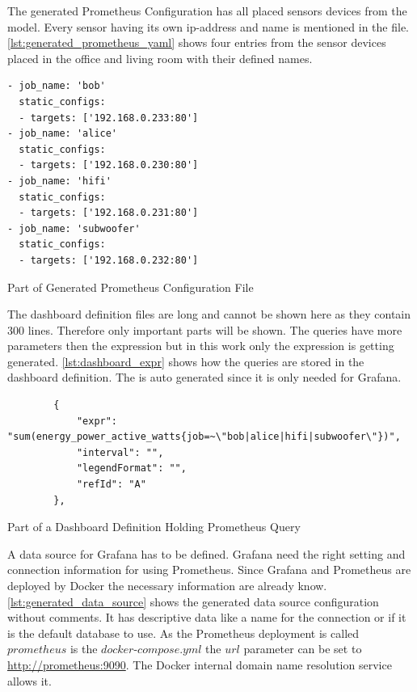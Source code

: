 The generated Prometheus Configuration has all placed sensors devices from the model. Every sensor having its own \gls{ip-address} and name is mentioned in the file. \cref{lst:generated_prometheus_yaml} shows four entries from the sensor devices placed in the office and living room with their defined names.

\begin{listing}[!ht]
	\begin{verbatim}
- job_name: 'bob'
  static_configs:
  - targets: ['192.168.0.233:80']
- job_name: 'alice'
  static_configs:
  - targets: ['192.168.0.230:80']
- job_name: 'hifi'
  static_configs:
  - targets: ['192.168.0.231:80']
- job_name: 'subwoofer'
  static_configs:
  - targets: ['192.168.0.232:80']
	\end{verbatim}
	\caption{Part of Generated Prometheus Configuration File}
	\label{lst:generated_prometheus_yaml}
\end{listing}

The dashboard definition files are long and cannot be shown here as they contain 300 lines. Therefore only important parts will be shown. The queries have more parameters then the expression but in this work only the expression is getting generated. \cref{lst:dashboard_expr} shows how the queries are stored in the dashboard definition. The  is auto generated since it is only needed for Grafana.

\begin{listing}[!ht]
	\begin{verbatim}
		{
			"expr": "sum(energy_power_active_watts{job=~\"bob|alice|hifi|subwoofer\"})",
			"interval": "",
			"legendFormat": "",
			"refId": "A" 
		},
	\end{verbatim}
	\caption{Part of a Dashboard Definition Holding Prometheus Query}
	\label{lst:dashboard_expr}
\end{listing}

A data source for Grafana has to be defined. Grafana need the right setting and connection information for using Prometheus. Since Grafana and Prometheus are deployed by Docker the necessary information are already know. \cref{lst:generated_data_source} shows the generated data source configuration without comments. It has descriptive data like a name for the connection or if it is the default database to use. As the Prometheus deployment is called $prometheus$ is the $docker\text{-}compose.yml$ the $url$ parameter can be set to \url{http://prometheus:9090}. The Docker internal domain name resolution service allows it.

